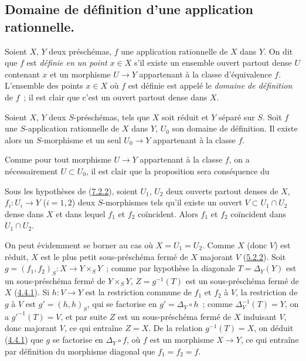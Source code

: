 \subsection{Domaine de définition d'une application rationnelle.}
\label{subsection:I.7.2-fr}

\begin{env}[7.2.1]
\label{I.7.2.1-fr}
Soient $X$, $Y$ deux préschémas, $f$ une application rationnelle de $X$ dans
$Y$. On dit que $f$ est \emph{définie en un point $x\in X$} s'il existe un
ensemble ouvert partout dense $U$ contenant $x$ et un morphisme $U\to Y$
appartenant à la classe d'équivalence $f$. L'ensemble des points $x\in X$ où
$f$ est définie est appelé le \emph{domaine de définition} de $f$~; il est
clair que c'est un ouvert partout dense dans $X$.
\end{env}

\begin{proposition}[7.2.2]
\label{I.7.2.2-fr}
Soient $X$, $Y$ deux $S$-préschémas, tels que $X$ soit réduit et $Y$ séparé
sur $S$. Soit $f$ une $S$-application rationnelle de $X$ dans $Y$, $U_0$ son
domaine de définition. Il existe alors un $S$-morphisme et un seul $U_0\to Y$
appartenant à la classe $f$.
\end{proposition}

Comme pour tout morphisme $U\to Y$ appartenant à la classe $f$, on a
nécessairement $U\subset U_0$, il est clair que la proposition sera
conséquence du

\begin{lemma}[7.2.2.1]
\label{I.7.2.2.1-fr}
Sous les hypothèses de \textup{(\hyperref[I.7.2.2-fr]{7.2.2})}, soient $U_1$, $U_2$
deux ouverts partout denses de $X$, $f_i:U_i\to Y$ ($i=1,2$) deux
$S$-morphismes tels qu'il existe un ouvert $V\subset U_1\cap U_2$ dense dans
$X$ et dans lequel $f_1$ et $f_2$ coïncident. Alors $f_1$ et $f_2$ coïncident
dans $U_1\cap U_2$.
\end{lemma}

On peut évidemment se borner au cas où $X=U_1=U_2$. Comme $X$ (donc $V$)
est réduit, $X$ est le plus petit sous-préschéma fermé de $X$ majorant $V$
(\hyperref[I.5.2.2-fr]{5.2.2}). Soit
$g=(f_1,f_2)_S:X\to Y\times_S Y$~; comme par hypothèse la diagonale
$T=\Delta_Y(Y)$ est un sous-préschéma fermé de $Y\times_S Y$,
$Z=g^{-1}(T)$ est un sous-préschéma fermé de $X$
(\hyperref[I.4.4.1-fr]{4.4.1}). Si $h:V\to Y$ est la restriction commune de
$f_1$ et $f_2$ à $V$, la restriction de $g$ à $V$ est $g'=(h,h)_S$, qui se
factorise en $g'=\Delta_Y\circ h$~; comme $\Delta_Y^{-1}(T)=Y$, on a
$g'^{-1}(T)=V$, et par suite $Z$ est un sous-préschéma fermé de $X$ induisant
$V$, donc majorant $V$, ce qui entraîne $Z=X$. De la relation
$g^{-1}(T)=X$, on déduit (\hyperref[I.4.4.1-fr]{4.4.1}) que $g$ se factorise
en $\Delta_Y\circ f$, où $f$ est un morphisme $X\to Y$, ce qui entraîne par
définition du morphisme diagonal que $f_1=f_2=f$.

